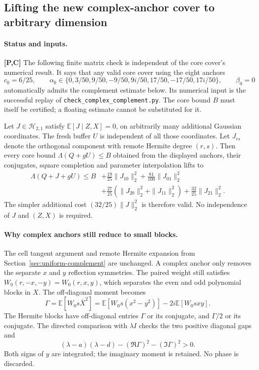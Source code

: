\subsection{Lifting the new complex-anchor cover to arbitrary dimension}
\label{sec:complex-anchor-complement}

\paragraph{Status and inputs.} \textbf{[P,C]} The following finite matrix
check is independent of the core cover's numerical result. It says that
any valid core cover using the eight anchors
\[
 c_0=6/25,\qquad
 \alpha_0\in\{0,3/50,9/50,-9/50,9i/50,17/50,-17/50,17i/50\},
 \qquad\beta_0=0
\]
automatically admits the complement estimate below. Its numerical input
is the successful replay of \texttt{check\_complex\_complement.py}.
The core bound $B$ must itself be certified; a floating estimate cannot
be substituted for it.

Let $J\in\mathcal H_{2,1}$ satisfy $\mathbb E[J\mid Z,X]=0$, on
arbitrarily many additional Gaussian coordinates. The fresh buffer $U$
is independent of all those coordinates. Let $J_{rs}$ denote the
orthogonal component with remote Hermite degree $(r,s)$. Then every
core bound $\Lambda(Q+gU)\le B$ obtained from the displayed anchors,
their conjugates, square completion and parameter interpolation lifts to
\[
\begin{split}
 \Lambda(Q+J+gU)\le B
 &+\frac{19}{25}\|J_{10}\|_2^2
 +\frac{81}{100}\|J_{01}\|_2^2\\
 &+\frac{27}{25}(\|J_{20}\|_2^2+\|J_{11}\|_2^2)
 +\frac{32}{25}\|J_{21}\|_2^2.
\end{split}
\]
The simpler additional cost $(32/25)\|J\|_2^2$ is therefore valid.
No independence of $J$ and $(Z,X)$ is required.

\paragraph{Why complex anchors still reduce to small blocks.}
The cell tangent argument and remote Hermite expansion from
Section~\ref{sec:uniform-complement} are unchanged. A complex anchor
only removes the separate $x$ and $y$ reflection symmetries. The paired
weight still satisfies $W_0(r,-x,-y)=W_0(r,x,y)$, which separates the
even and odd polynomial blocks in $X$. The off-diagonal moment becomes
\[
 \Gamma=\mathbb E[W_0s\overline X^2]
 =\mathbb E[W_0s(x^2-y^2)]-2i\mathbb E[W_0sxy].
\]
The Hermite blocks have off-diagonal entries $\Gamma$ or its conjugate,
and $\Gamma/2$ or its conjugate. The directed comparison with $\lambda I$
checks the two positive diagonal gaps and
\[
 (\lambda-a)(\lambda-d)-(\Re\Gamma)^2-(\Im\Gamma)^2>0.
\]
Both signs of $y$ are integrated; the imaginary moment is retained.
No phase is discarded.

